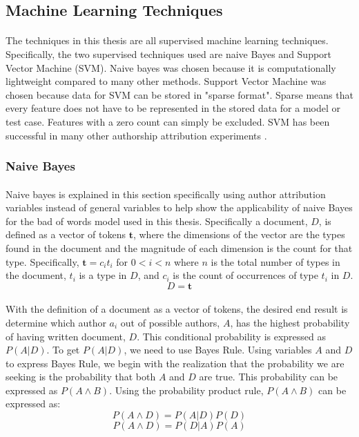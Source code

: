 	\subsection {Machine Learning Techniques}
		\paragraph{}The techniques in this thesis are all supervised machine learning techniques.  Specifically, the two supervised techniques used are naive Bayes and Support Vector Machine (SVM).  Naive bayes was chosen because it is computationally lightweight compared to many other methods.  Support Vector Machine was chosen because data for SVM can be stored in "sparse format".  Sparse means that every feature does not have to be represented in the stored data for a model or test case.  Features with a zero count can simply be excluded.  SVM has been successful in many other authorship attribution experiments \cite{jurafsky_speech_2009}.

		\subsubsection{Naive Bayes}
		\paragraph*{} Naive bayes is explained in this section specifically using author attribution variables instead of general variables to help show the applicability of naive Bayes for the bad of words model used in this thesis.  Specifically a document, $D$, is defined as a vector of tokens $\mathbf{t}$, where the dimensions of the vector are the types found in the document and the magnitude of each dimension is the count for that type.  Specifically, $\mathbf{t} = c_i t_i $ for $ 0 < i < n $ where $n$ is the total number of types in the document, $t_i$ is a type in $D$, and $c_i$ is the count of occurrences of type $t_i$ in $D$.
		\begin{equation}D = \mathbf{t}\end{equation}
		
		\paragraph{} With the definition of a document as a vector of tokens, the desired end result is determine which author $a_i$ out of possible authors, $A$, has the highest probability of having written document, $D$.  This conditional probability is expressed as $P(A|D)$.  To get $P(A|D)$, we need to use Bayes Rule.  Using variables $A$ and $D$ to express Bayes Rule, we begin with the realization that the probability we are seeking is the probability that both $A$ and $D$ are true.  This probability can be expressed as $P(A \land B)$.  Using the probability product rule, $P(A \land B)$ can be expressed as:
		\begin{equation} \label{eqn:product-rule_1} P(A \land D) = P(A|D) P(D) \end{equation}
		\begin{equation} \label{eqn:product-rule_2}P(A \land D) = P(D|A) P(A) \end{equation}
		
